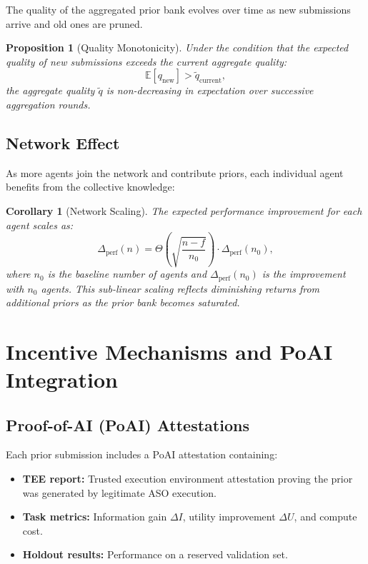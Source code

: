 \documentclass[11pt]{article}
\newtheorem{proposition}[theorem]{Proposition}
\newtheorem{corollary}[theorem]{Corollary}
\begin{document}
The quality of the aggregated prior bank evolves over time as new submissions
arrive and old ones are pruned.

\begin{proposition}[Quality Monotonicity]
Under the condition that the expected quality of new submissions exceeds the
current aggregate quality:
\begin{equation}
    \mathbb{E}[q_{\text{new}}] > \tilde{q}_{\text{current}},
\end{equation}
the aggregate quality $\tilde{q}$ is non-decreasing in expectation over
successive aggregation rounds.
\end{proposition}

\subsection{Network Effect}

As more agents join the network and contribute priors, each individual agent
benefits from the collective knowledge:

\begin{corollary}[Network Scaling]
The expected performance improvement for each agent scales as:
\begin{equation}
    \Delta_{\text{perf}}(n) = \Theta\left(\sqrt{\frac{n-f}{n_0}}\right) \cdot \Delta_{\text{perf}}(n_0),
\end{equation}
where $n_0$ is the baseline number of agents and $\Delta_{\text{perf}}(n_0)$ is
the improvement with $n_0$ agents. This sub-linear scaling reflects diminishing
returns from additional priors as the prior bank becomes saturated.
\end{corollary}

\section{Incentive Mechanisms and PoAI Integration}
\label{sec:incentives}

\subsection{Proof-of-AI (PoAI) Attestations}

Each prior submission includes a PoAI attestation containing:
\begin{itemize}[leftmargin=1.5em]
    \item \textbf{TEE report:} Trusted execution environment attestation proving
          the prior was generated by legitimate ASO execution.
    \item \textbf{Task metrics:} Information gain $\Delta I$, utility improvement
          $\Delta U$, and compute cost.
    \item \textbf{Holdout results:} Performance on a reserved validation set.
\end{itemize}
\end{document}
